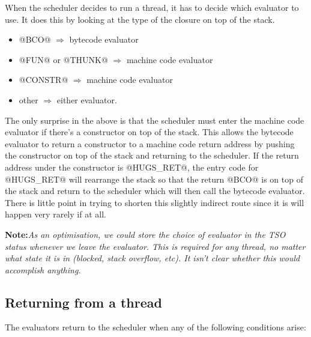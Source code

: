 \documentclass[11pt]{article}
\newcommand{\note}[1]{{{\bf Note:}\sl #1}}
\newcommand{\Subsection}[2]{\subsection{#1}\label{sec:#2}}
\begin{document}
When the scheduler decides to run a thread, it has to decide which
evaluator to use.  It does this by looking at the type of the closure
on top of the stack.
\begin{itemize}
\item @BCO@ $\Rightarrow$ bytecode evaluator
\item @FUN@ or @THUNK@ $\Rightarrow$ machine code evaluator
\item @CONSTR@ $\Rightarrow$ machine code evaluator
\item other $\Rightarrow$ either evaluator.
\end{itemize}

The only surprise in the above is that the scheduler must enter the
machine code evaluator if there's a constructor on top of the stack.
This allows the bytecode evaluator to return a constructor to a
machine code return address by pushing the constructor on top of the
stack and returning to the scheduler.  If the return address under the
constructor is @HUGS_RET@, the entry code for @HUGS_RET@ will
rearrange the stack so that the return @BCO@ is on top of the stack
and return to the scheduler which will then call the bytecode
evaluator.  There is little point in trying to shorten this slightly
indirect route since it is will happen very rarely if at all.

\note{As an optimisation, we could store the choice of evaluator in
the TSO status whenever we leave the evaluator.  This is required for
any thread, no matter what state it is in (blocked, stack overflow,
etc).  It isn't clear whether this would accomplish anything.}

\Subsection{Returning from a thread}{thread-return}

The evaluators return to the scheduler when any of the following
conditions arise:
\end{document}
